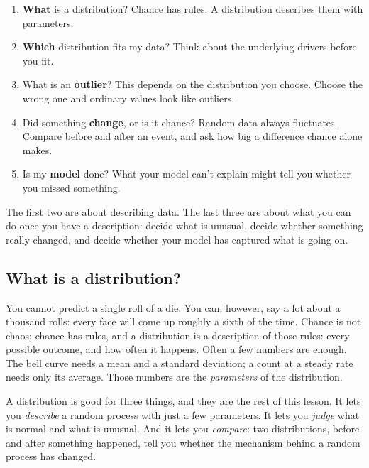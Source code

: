 \documentclass[12pt, a4paper]{article}
\theoremstyle{definition}
\theoremstyle{remark}
\begin{document}
\begin{enumerate}
\item \textbf{What} is a distribution? Chance has rules. A distribution describes them with parameters.
\item \textbf{Which} distribution fits my data? Think about the underlying drivers before you fit.
\item What is an \textbf{outlier}? This depends on the distribution you choose. Choose the wrong one and ordinary values look like outliers.
\item Did something \textbf{change}, or is it chance? Random data always fluctuates. Compare before and after an event, and ask how big a difference chance alone makes.
\item Is my \textbf{model} done? What your model can't explain might tell you whether you missed something.
\end{enumerate}

The first two are about describing data. The last three are about what you can do once you have a description: decide what is unusual, decide whether something really changed, and decide whether your model has captured what is going on.

\subsection{What is a distribution?}
\label{sec:what-is-a-distribution}
You cannot predict a single roll of a die. You can, however, say a lot about a thousand rolls: every face will come up roughly a sixth of the time. Chance is not chaos; chance has rules, and a distribution is a description of those rules: every possible outcome, and how often it happens. Often a few numbers are enough. The bell curve needs a mean and a standard deviation; a count at a steady rate needs only its average. Those numbers are the \emph{parameters} of the distribution.

A distribution is good for three things, and they are the rest of this lesson. It lets you \emph{describe} a random process with just a few parameters. It lets you \emph{judge} what is normal and what is unusual. And it lets you \emph{compare}: two distributions, before and after something happened, tell you whether the mechanism behind a random process has changed.
\end{document}
